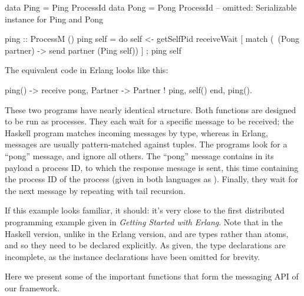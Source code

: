 \documentclass[preprint]{sigplanconf}
\begin{document}
\begin{code}[caption={Ping in Haskell}]
data Ping = Ping ProcessId
data Pong = Pong ProcessId
-- omitted: Serializable instance for Ping and Pong

ping :: ProcessM ()
ping self = 
   do { self <- getSelfPid
        receiveWait [
          match (\ (Pong partner) -> 
            send partner (Ping self)) ]
      ; ping self }
\end{code}

The equivalent code in Erlang looks like this:

\begin{code}[language=Erlang,caption={Ping in Erlang}]
ping() ->
  receive
    {pong, Partner} -> 
      Partner ! {ping, self()}
  end,
  ping().               
\end{code}

These two programs have nearly identical structure. Both  functions are designed to be run as processes. They each wait for a specific message to be received; the Haskell program matches incoming messages by type, whereas in Erlang, messages are usually pattern-matched against tuples. The programs look for a ``pong'' message, and ignore all others. The ``pong'' message contains in its payload a process ID, to which the response message is sent, this time containing the process ID of the  process (given in both languages as ). Finally, they wait for the next message by repeating with tail recursion.

If this example looks familiar, it should: it's very close to the first distributed programming example given in {\em Getting Started with Erlang}. Note that in the Haskell version, unlike in the Erlang version,  and  are types rather than atoms, and so they need to be declared explicitly. As given, the type declarations are incomplete, as the instance declarations have been omitted for brevity.

Here we present some of the important functions that form the messaging API of our framework.
\end{document}
